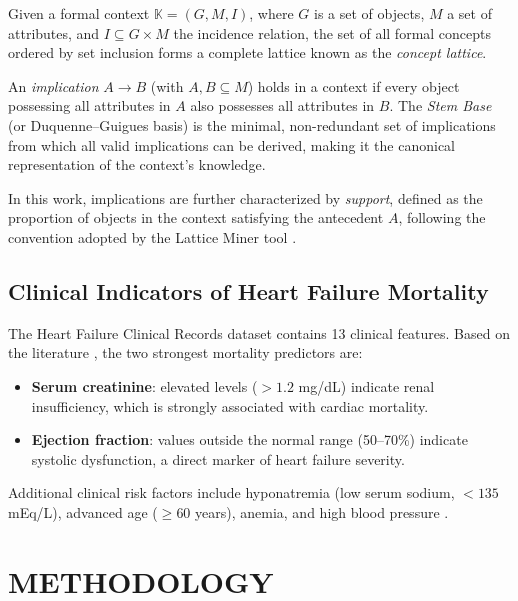 \documentclass[a4paper,twoside]{article}
\begin{document}
Given a formal context $\mathbb{K} = (G, M, I)$, where $G$ is a set of objects, $M$ a set of attributes, and $I \subseteq G \times M$ the incidence relation, the set of all formal concepts ordered by set inclusion forms a complete lattice known as the \textit{concept lattice}.

An \textit{implication} $A \rightarrow B$ (with $A, B \subseteq M$) holds in a context if every object possessing all attributes in $A$ also possesses all attributes in $B$. The \textit{Stem Base} (or Duquenne–Guigues basis) \cite{Ganter1999} is the minimal, non-redundant set of implications from which all valid implications can be derived, making it the canonical representation of the context's knowledge.

In this work, implications are further characterized by \textit{support}, defined as the proportion of objects in the context satisfying the antecedent $A$, following the convention adopted by the Lattice Miner tool \cite{Missaoui2017}.

\subsection{Clinical Indicators of Heart Failure Mortality}

The Heart Failure Clinical Records dataset contains 13 clinical features. Based on the literature \cite{Chicco2020, Ahmad2017}, the two strongest mortality predictors are:

\begin{itemize}
    \item \textbf{Serum creatinine}: elevated levels ($> 1.2$ mg/dL) indicate renal insufficiency, which is strongly associated with cardiac mortality.
    \item \textbf{Ejection fraction}: values outside the normal range (50--70\%) indicate systolic dysfunction, a direct marker of heart failure severity.
\end{itemize}

Additional clinical risk factors include hyponatremia (low serum sodium, $< 135$ mEq/L), advanced age ($\geq 60$ years), anemia, and high blood pressure \cite{Chicco2020}.

\section{\uppercase{Methodology}}
\label{sec:methodology}
\end{document}
